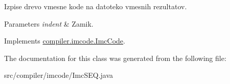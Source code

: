 Izpise drevo vmesne kode na datoteko vmesnih rezultatov.


\begin{DoxyParams}{Parameters}
{\em indent} & Zamik. \\
\hline
\end{DoxyParams}


Implements \hyperlink{interfacecompiler_1_1imcode_1_1_imc_code_a26451dea2ab4dbd7054ac33f4c6d71fe}{compiler.\+imcode.\+Imc\+Code}.



The documentation for this class was generated from the following file\+:\begin{DoxyCompactItemize}
\item 
src/compiler/imcode/Imc\+S\+E\+Q.\+java\end{DoxyCompactItemize}
